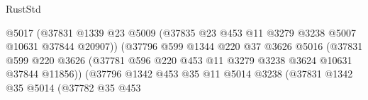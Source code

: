 \begin{lexlean}{RustStd}
\begin{coremodule}
                                          @5017
                                          (@37831
                                            @1339
                                            @23
                                            @5009
                                            (@37835
                                              @23
                                              @453
                                              @11
                                              @3279
                                              @3238
                                              @5007
                                              @10631
                                              @37844
                                              @20907))
                                          (@37796
                                            @599
                                            @1344
                                            @220
                                            @37
                                            @3626
                                            @5016
                                            (@37831
                                              @599
                                              @220
                                              @3626
                                              (@37781
                                                @596
                                                @220
                                                @453
                                                @11
                                                @3279
                                                @3238
                                                @3624
                                                @10631
                                                @37844
                                                @11856))
                                            (@37796
                                              @1342
                                              @453
                                              @35
                                              @11
                                              @5014
                                              @3238
                                              (@37831
                                                @1342
                                                @35
                                                @5014
                                                (@37782
                                                  @35
                                                  @453

\end{coremodule}
\end{lexlean}

